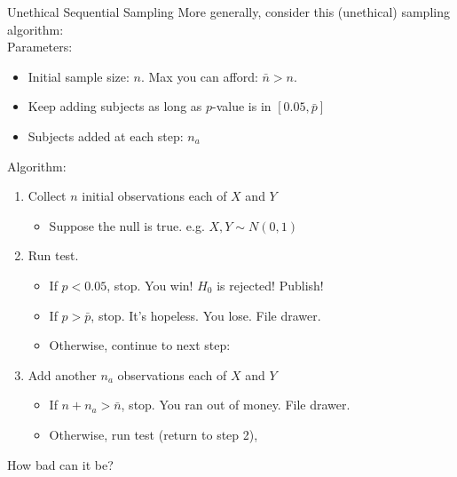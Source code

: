 \begin{frame}{Unethical Sequential Sampling}
More generally, consider this (unethical) sampling algorithm:\\
Parameters: 
\begin{itemize}
    \item Initial sample size: $n$. Max you can afford: $\bar{n}>n$.
    \item Keep adding subjects as long as $p$-value is in $[0.05,\bar{p}]$
    \item Subjects added at each step: $n_a$
\end{itemize}
Algorithm:
\begin{enumerate}
    \item Collect $n$ initial observations each of $X$ and $Y$
    \begin{itemize}
        \item Suppose the null is true. e.g. $X,Y\sim N(0,1)$
    \end{itemize}
    \item Run test. 
    \begin{itemize}
        \item If $p<0.05$, stop. You win! $H_0$ is rejected! Publish!
        \item If $p>\bar{p}$, stop. It's hopeless. You lose. File drawer.
        \item Otherwise, continue to next step:
    \end{itemize}
    \item Add another $n_a$ observations each of $X$ and $Y$
    \begin{itemize}
        \item If $n+n_a>\bar{n}$, stop. You ran out of money. File drawer.
        \item Otherwise, run test (return to step 2), 
    \end{itemize} 
\end{enumerate}
How bad can it be?
\end{frame}

